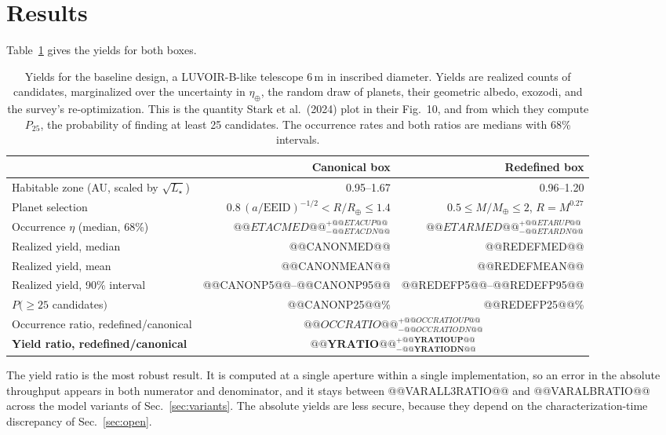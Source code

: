 \documentclass[11pt,a4paper]{article}
\begin{document}
\section{Results}
\label{sec:results}

Table~\ref{tab:answer} gives the yields for both boxes.

\begin{table}[htbp]
\centering
\small
\begin{tabular}{lrr}
\toprule
& \textbf{Canonical box} & \textbf{Redefined box} \\
\midrule
Habitable zone (AU, scaled by $\sqrt{L_\star}$) & 0.95--1.67 & 0.96--1.20 \\
Planet selection & $0.8\,(a/\mathrm{EEID})^{-1/2} < R/R_\oplus \le 1.4$ & $0.5 \le M/M_\oplus \le 2$, $R=M^{0.27}$ \\
Occurrence $\eta$ (median, 68\%) & $@@ETACMED@@^{+@@ETACUP@@}_{-@@ETACDN@@}$ & $@@ETARMED@@^{+@@ETARUP@@}_{-@@ETARDN@@}$ \\
Realized yield, median & @@CANONMED@@ & @@REDEFMED@@ \\
Realized yield, mean & @@CANONMEAN@@ & @@REDEFMEAN@@ \\
Realized yield, 90\% interval & @@CANONP5@@--@@CANONP95@@ & @@REDEFP5@@--@@REDEFP95@@ \\
$P(\ge 25$ candidates$)$ & @@CANONP25@@\% & @@REDEFP25@@\% \\
\midrule
Occurrence ratio, redefined/canonical & \multicolumn{2}{c}{$@@OCCRATIO@@^{+@@OCCRATIOUP@@}_{-@@OCCRATIODN@@}$} \\
\textbf{Yield ratio, redefined/canonical} & \multicolumn{2}{c}{$\mathbf{@@YRATIO@@^{+@@YRATIOUP@@}_{-@@YRATIODN@@}}$} \\
\bottomrule
\end{tabular}
\caption{Yields for the baseline design, a LUVOIR-B-like telescope 6\,m in inscribed diameter.
Yields are realized counts of candidates, marginalized over the uncertainty in $\eta_\oplus$, the
random draw of planets, their geometric albedo, exozodi, and the survey's re-optimization. This is
the quantity Stark et al.\ (2024) plot in their Fig.~10, and from which they compute $P_{25}$, the
probability of finding at least 25 candidates. The occurrence rates and both ratios are medians
with 68\% intervals.}
\label{tab:answer}
\end{table}

The yield ratio is the most robust result. It is computed at a single aperture within a single
implementation, so an error in the absolute throughput appears in both numerator and denominator,
and it stays between @@VARALL3RATIO@@ and @@VARALBRATIO@@ across the model variants of
Sec.~\ref{sec:variants}. The absolute
yields are less secure, because they depend on the characterization-time discrepancy of
Sec.~\ref{sec:open}.
\end{document}
